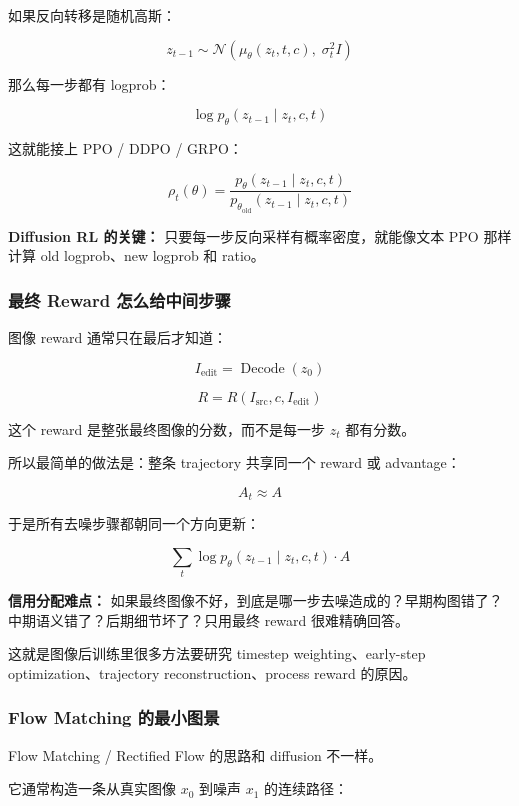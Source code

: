 如果反向转移是随机高斯：

\[
z_{t-1}
\sim
\mathcal{N}
\left(
\mu_\theta(z_t,t,c),\;
\sigma_t^2 I
\right)
\]

那么每一步都有 logprob：

\[
\log p_\theta(z_{t-1}\mid z_t,c,t)
\]

这就能接上 PPO / DDPO / GRPO：

\[
\rho_t(\theta)
=
\frac{
p_\theta(z_{t-1}\mid z_t,c,t)
}{
p_{\theta_\text{old}}(z_{t-1}\mid z_t,c,t)
}
\]

\begin{summarybox}
\textbf{Diffusion RL 的关键：} 只要每一步反向采样有概率密度，就能像文本 PPO 那样计算 old logprob、new logprob 和 ratio。
\end{summarybox}

\subsubsection{最终 Reward 怎么给中间步骤}

图像 reward 通常只在最后才知道：

\[
I_\text{edit}
=
\operatorname{Decode}(z_0)
\]

\[
R
=
R(I_\text{src},c,I_\text{edit})
\]

这个 reward 是整张最终图像的分数，而不是每一步 $z_t$ 都有分数。

所以最简单的做法是：整条 trajectory 共享同一个 reward 或 advantage：

\[
A_t \approx A
\]

于是所有去噪步骤都朝同一个方向更新：

\[
\sum_t
\log p_\theta(z_{t-1}\mid z_t,c,t)
\cdot A
\]

\begin{warnbox}
\textbf{信用分配难点：} 如果最终图像不好，到底是哪一步去噪造成的？早期构图错了？中期语义错了？后期细节坏了？只用最终 reward 很难精确回答。
\end{warnbox}

这就是图像后训练里很多方法要研究 timestep weighting、early-step optimization、trajectory reconstruction、process reward 的原因。

\subsubsection{Flow Matching 的最小图景}

Flow Matching / Rectified Flow 的思路和 diffusion 不一样。

它通常构造一条从真实图像 $x_0$ 到噪声 $x_1$ 的连续路径：

